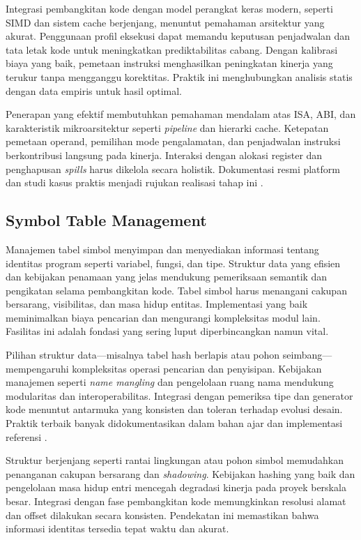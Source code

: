 \documentclass[../main.tex]{subfiles}
\begin{document}
Integrasi pembangkitan kode dengan model perangkat keras modern, seperti SIMD dan sistem cache berjenjang, menuntut pemahaman arsitektur yang akurat. Penggunaan profil eksekusi dapat memandu keputusan penjadwalan dan tata letak kode untuk meningkatkan prediktabilitas cabang. Dengan kalibrasi biaya yang baik, pemetaan instruksi menghasilkan peningkatan kinerja yang terukur tanpa mengganggu korektitas. Praktik ini menghubungkan analisis statis dengan data empiris untuk hasil optimal.

Penerapan yang efektif membutuhkan pemahaman mendalam atas ISA, ABI, dan karakteristik mikroarsitektur seperti \emph{pipeline} dan hierarki cache. Ketepatan pemetaan operand, pemilihan mode pengalamatan, dan penjadwalan instruksi berkontribusi langsung pada kinerja. Interaksi dengan alokasi register dan penghapusan \emph{spills} harus dikelola secara holistik. Dokumentasi resmi platform dan studi kasus praktis menjadi rujukan realisasi tahap ini \citep{WikiInstructionSelection,WikiRegisterAllocation}.

\subsection{Symbol Table Management}
Manajemen tabel simbol menyimpan dan menyediakan informasi tentang identitas program seperti variabel, fungsi, dan tipe. Struktur data yang efisien dan kebijakan penamaan yang jelas mendukung pemeriksaan semantik dan pengikatan selama pembangkitan kode. Tabel simbol harus menangani cakupan bersarang, visibilitas, dan masa hidup entitas. Implementasi yang baik meminimalkan biaya pencarian dan mengurangi kompleksitas modul lain. Fasilitas ini adalah fondasi yang sering luput diperbincangkan namun vital.

Pilihan struktur data—misalnya tabel hash berlapis atau pohon seimbang—mempengaruhi kompleksitas operasi pencarian dan penyisipan. Kebijakan manajemen seperti \emph{name mangling} dan pengelolaan ruang nama mendukung modularitas dan interoperabilitas. Integrasi dengan pemeriksa tipe dan generator kode menuntut antarmuka yang konsisten dan toleran terhadap evolusi desain. Praktik terbaik banyak didokumentasikan dalam bahan ajar dan implementasi referensi \citep{CS143}.

Struktur berjenjang seperti rantai lingkungan atau pohon simbol memudahkan penanganan cakupan bersarang dan \emph{shadowing}. Kebijakan hashing yang baik dan pengelolaan masa hidup entri mencegah degradasi kinerja pada proyek berskala besar. Integrasi dengan fase pembangkitan kode memungkinkan resolusi alamat dan offset dilakukan secara konsisten. Pendekatan ini memastikan bahwa informasi identitas tersedia tepat waktu dan akurat.
\end{document}

